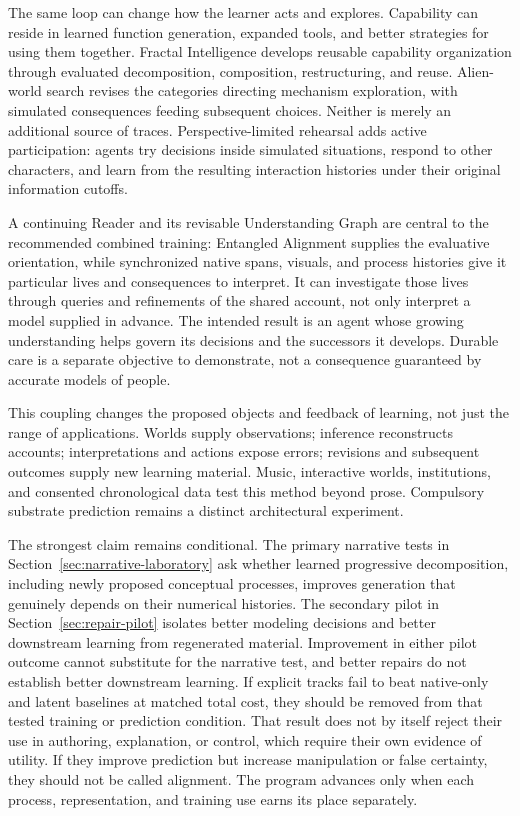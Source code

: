 \documentclass[10pt]{article}
\begin{document}
The same loop can change how the learner acts and explores. Capability can
reside in learned function generation, expanded tools, and better strategies
for using them together. Fractal
Intelligence develops reusable capability organization through evaluated
decomposition, composition, restructuring, and reuse. Alien-world search
revises the categories directing mechanism exploration, with simulated
consequences feeding subsequent choices. Neither is merely an additional
source of traces. Perspective-limited rehearsal adds active participation:
agents try decisions inside simulated situations, respond to other characters,
and learn from the resulting interaction histories under their original
information cutoffs.

A continuing Reader and its revisable Understanding Graph
are central to the recommended combined training: Entangled Alignment supplies
the evaluative orientation, while synchronized native spans, visuals, and
process histories give it particular lives and consequences to interpret.
It can investigate those lives through queries and refinements of the shared
account, not only interpret a model supplied in advance.
The intended result is an agent whose growing understanding helps govern its
decisions and the successors it develops. Durable care is a separate objective
to demonstrate, not a consequence guaranteed by accurate models of people.

This coupling changes the proposed objects and feedback of learning, not just
the range of applications. Worlds supply observations; inference reconstructs
accounts; interpretations and actions expose errors; revisions and subsequent
outcomes supply new learning material. Music, interactive worlds, institutions,
and consented chronological data test this method beyond prose. Compulsory
substrate prediction remains a distinct architectural experiment.

The strongest claim remains conditional. The primary narrative tests in
Section~\ref{sec:narrative-laboratory} ask whether learned progressive
decomposition, including newly proposed conceptual processes, improves
generation that genuinely depends on their numerical histories. The secondary
pilot in Section~\ref{sec:repair-pilot} isolates better modeling decisions and
better downstream learning from regenerated material. Improvement in either
pilot outcome cannot substitute for the narrative test, and better repairs
do not establish better downstream learning. If explicit tracks fail to beat
native-only and latent baselines at matched total cost, they should be removed
from that tested training or prediction condition. That result does not by
itself reject their use in authoring, explanation, or control, which require
their own evidence of utility.
If they improve prediction but increase manipulation or false certainty, they
should not be called alignment. The program advances only when each process,
representation, and training use earns its place separately.
\end{document}
